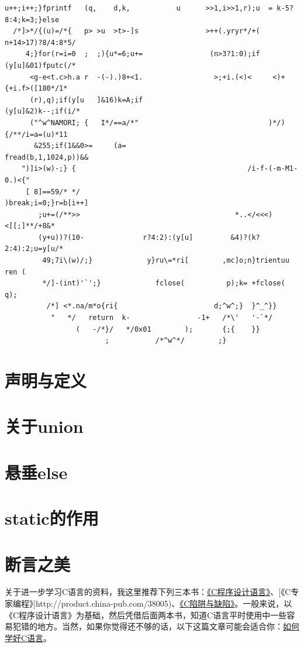 \documentclass[a4paper]{book}
\begin{document}
{\begin{shaded}
\begin{verbatim}
u++;i++;}fprintf   (q,    d,k,           u      >>1,i>>1,r);u  = k-5?8:4;k=3;}else
  /*]>*/{(u)=/*{   p> >u  >t>-]s                >++(.yryr*/+(    n+14>17)?8/4:8*5/
     4;}for(r=i=0  ;  ;){u*=6;u+=                (n>3?1:0);if    (y[u]&01)fputc(/*
      <g-e<t.c>h.a r  -(-).)8+<1.                 >;+i.(<)<     <)+{+i.f>([180*/1*
      (r),q);if(y[u   ]&16)k=A;if                               (y[u]&2)k--;if(i/*
      ("^w^NAMORI; {   I*/==a/*"                               )*/){/**/i=a=(u)*11
       &255;if(1&&0>=     (a=                                 fread(b,1,1024,p))&&
	")]i>(w)-;} {                                         /i-f-(-m-M1-0.)<{"
	 [ 8]==59/* */                                       )break;i=0;}r=b[i++]
	    ;u+=(/**>>                                     *..</<<<)<[[;]**/+8&*
	    (y+u))?(10-              r?4:2):(y[u]         &4)?(k?2:4):2;u=y[u/*
	     49;7i\(w)/;}             y}ru\=*ri[        ,mc]o;n}trientuu ren (
	     */]-(int)'`';}             fclose(          p);k= +fclose( q);
	      /*] <*.na/m*o{ri{                       d;^w^;}  }^_^}}
	       "   */   return  k-                -1+   /*\'   '-`*/
	             (   -/*}/   */0x01        );       {;{    }}
	                    ;           /*^w^*/        ;}
\end{verbatim}\end{shaded}}
\section{声明与定义}

\section{关于union}

\section{悬垂else}

\section{static的作用}

\section{断言之美}

关于进一步学习C语言的资料，我这里推荐下列三本书：\href{http://product.china-pub.com/14975\&ref=browse}{《C程序设计语言》}、{[}《C专家编程》{]}http://product.china-pub.com/38005)、\href{http://product.china-pub.com/38125}{《C陷阱与缺陷》}。一般来说，以《C程序设计语言》为基础，然后凭借后面两本书，知道C语言平时使用中一些容易犯错的地方。当然，如果你觉得还不够的话，以下这篇文章可能会适合你：\href{http://coolshell.cn/articles/4102.html}{如何学好C语言}。
\end{document}

